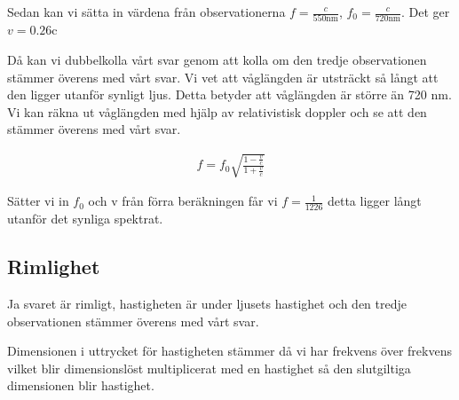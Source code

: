 \documentclass[a4paper]{article}
\begin{document}
Sedan kan vi sätta in värdena från observationerna $f = \frac{c}{550\text{nm}}$, $f_0 = \frac{c}{720\text{nm}}$. Det ger $v= 0.26$c

Då kan vi dubbelkolla vårt svar genom att kolla om den tredje observationen stämmer överens med vårt svar. Vi vet att våglängden är utsträckt så långt att den ligger utanför synligt ljus. Detta betyder att våglängden är större än 720 nm. Vi kan räkna ut våglängden med hjälp av relativistisk doppler och se att den stämmer överens med vårt svar.

\begin{align*}
    f = f_0 \sqrt{\frac{1 - \frac{v}{c}}{1 + \frac{v}{c}}}
\end{align*}

Sätter vi in $f_0$ och v från förra beräkningen får vi $f = \frac{1}{1226}$ detta ligger långt utanför det synliga spektrat.

\subsection{Rimlighet}
Ja svaret är rimligt, hastigheten är under ljusets hastighet och den tredje observationen stämmer överens med vårt svar.

Dimensionen i uttrycket för hastigheten stämmer då vi har frekvens över frekvens vilket blir dimensionslöst multiplicerat med en hastighet så den slutgiltiga dimensionen blir hastighet.
\end{document}
